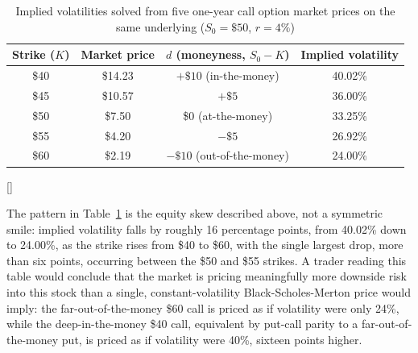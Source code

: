 \documentclass[../ai_in_finance]{subfiles}
\begin{document}
\begin{table}[htbp]
\centering
\begin{lrbox}{\bookmeasuredbox}
\begin{tabular}{cccc}
\toprule
Strike ($K$) & Market price & $d$ (moneyness, $S_0-K$) & Implied volatility \\
\midrule
\$40 & \$14.23 & $+\$10$ (in-the-money)      & 40.02\% \\
\$45 & \$10.57 & $+\$5$                        & 36.00\% \\
\$50 & \$7.50  & \$0 (at-the-money)            & 33.25\% \\
\$55 & \$4.20  & $-\$5$                        & 26.92\% \\
\$60 & \$2.19  & $-\$10$ (out-of-the-money)    & 24.00\% \\
\bottomrule
\end{tabular}
\end{lrbox}
\ifdim\wd\bookmeasuredbox<0.65\linewidth
\setlength{\bookcapwidth}{0.65\linewidth}
\else
\setlength{\bookcapwidth}{\wd\bookmeasuredbox}
\fi
{}[\bookcapwidth]{
\usebox{\bookmeasuredbox}
}{
\caption{Implied volatilities solved from five one-year call option market prices on the same underlying ($S_0=\$50$, $r=4\%$)}
\label{tab:vol_skew}
}
\end{table}

The pattern in Table~\ref{tab:vol_skew} is the equity skew described above, not a symmetric smile: implied volatility falls by roughly 16 percentage points, from 40.02\% down to 24.00\%, as the strike rises from \$40 to \$60, with the single largest drop, more than six points, occurring between the \$50 and \$55 strikes. A trader reading this table would conclude that the market is pricing meaningfully more downside risk into this stock than a single, constant-volatility Black-Scholes-Merton price would imply: the far-out-of-the-money \$60 call is priced as if volatility were only 24\%, while the deep-in-the-money \$40 call, equivalent by put-call parity to a far-out-of-the-money put, is priced as if volatility were 40\%, sixteen points higher.
\end{document}
